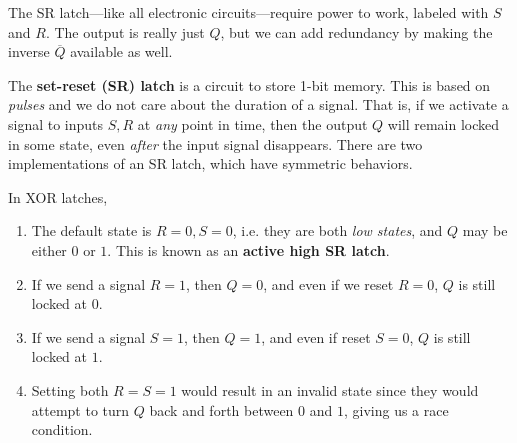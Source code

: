   The SR latch---like all electronic circuits---require power to work, labeled with $S$ and $R$. The output is really just $Q$, but we can add redundancy by making the inverse $\overline{Q}$ available as well. 

  \begin{definition}[SR Latch]
    The \textbf{set-reset (SR) latch} is a circuit to store 1-bit memory. This is based on \textit{pulses} and we do not care about the duration of a signal. That is, if we activate a signal to inputs $S, R$ at \textit{any} point in time, then the output $Q$ will remain locked in some state, even \textit{after} the input signal disappears. There are two implementations of an SR latch, which have symmetric behaviors. 

    In XOR latches, 
    \begin{enumerate}
      \item The default state is $R = 0, S = 0$, i.e. they are both \textit{low states}, and $Q$ may be either $0$ or $1$. This is known as an \textbf{active high SR latch}. 
      \item If we send a signal $R = 1$, then $Q = 0$, and even if we reset $R = 0$, $Q$ is still locked at $0$. 
      \item If we send a signal $S = 1$, then $Q = 1$, and even if reset $S = 0$, $Q$ is still locked at $1$. 
      \item Setting both $R = S = 1$ would result in an invalid state since they would attempt to turn $Q$ back and forth between $0$ and $1$, giving us a race condition. 
    \end{enumerate}

    \begin{figure}[H]
      \centering
      \begin{subfigure}[b]{0.48\textwidth}
        \centering
\end{subfigure}
\end{figure}
\end{definition}
